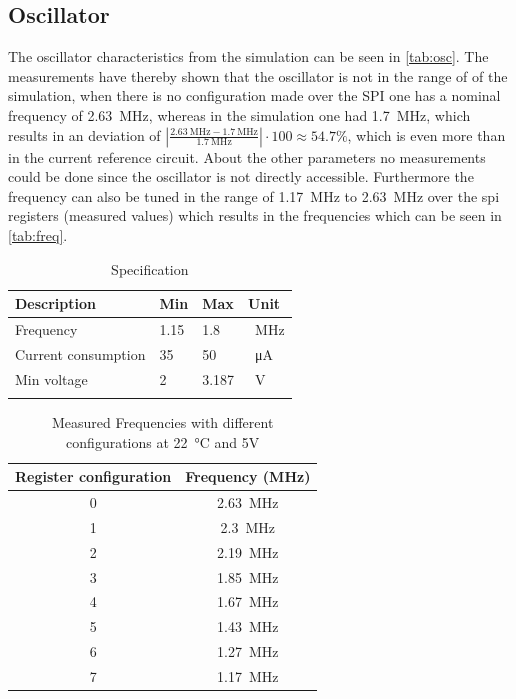 \subsection{Oscillator}
The oscillator characteristics from the simulation can be seen in \autoref{tab:osc}. The measurements have thereby shown that the oscillator is not in the range of of the simulation, when there is no configuration made over the SPI one has a nominal frequency of \qty{2.63}{\mega\hertz}, whereas in the simulation one had \qty{1.7}{\mega\hertz}, which results in an deviation of $\left|\frac{\qty{2.63}{\mega\hertz}-\qty{1.7}{\mega\hertz}}{\qty{1.7}{\mega\hertz}}\right|\cdot 100\approx 54.7 \%$, which is even more than in the current reference circuit. About the other parameters no measurements could be done since the oscillator is not directly accessible. Furthermore the frequency can also be tuned in the range of \qty{1.17}{\mega\hertz} to \qty{2.63}{\mega\hertz} over the spi registers (measured values) which results in the frequencies which can be seen in \autoref{tab:freq}. 
\begin{longtable}{|p{3.5cm}|p{3.5cm}|p{3.5cm}|p{3.5cm}|}
	\hline
	\rowcolor{lightgray}
	\textbf{Description} &\textbf{Min} &\textbf{Max} & \textbf{Unit} \\ \hline
	
	Frequency & 1.15 & 1.8 &\qty{}{\mega\hertz} \\ \hline
	Current consumption & 35 & 50 & \qty{}{\micro\ampere} \\ \hline
	Min voltage & 2& 3.187 & \qty{}{\volt} \\ \hline
	\caption{Specification} %
	\label{tab:osc}
\end{longtable}
\begin{table}[h]
	\centering
	\begin{tabular}{|c|c|}
		\hline
		\rowcolor{lightgray}
		Register configuration & Frequency (MHz) \\
		\hline
		0 & \qty{2.63}{\mega\hertz} \\
		\hline
		1 & \qty{2.3}{\mega\hertz} \\
		\hline
		2 & \qty{2.19}{\mega\hertz} \\
		\hline
		3 & \qty{1.85}{\mega\hertz} \\
		\hline
		4 & \qty{1.67}{\mega\hertz} \\
		\hline
		5 & \qty{1.43}{\mega\hertz} \\
		\hline
		6 & \qty{1.27}{\mega\hertz} \\
		\hline
		7 & \qty{1.17}{\mega\hertz} \\
		\hline
	\end{tabular}
	\caption{Measured Frequencies with different configurations at \qty{22}{\degreeCelsius} and 5V}
	\label{tab:freq}
\end{table}


